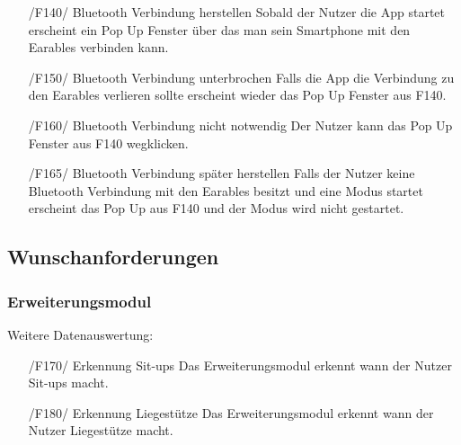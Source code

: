 \documentclass[a4paper,12pt]{article}
\begin{document}
\begin{itemize}
      \item[/F140/] \textsf{Bluetooth Verbindung herstellen} Sobald der Nutzer die App startet erscheint ein Pop Up Fenster über das man sein Smartphone mit den \gls{Earables} verbinden kann.
      \item[/F150/] \textsf{Bluetooth Verbindung unterbrochen} Falls die App die Verbindung zu den \gls{Earables} verlieren sollte erscheint wieder das Pop Up Fenster aus F140.
      \item[/F160/] \textsf{Bluetooth Verbindung nicht notwendig} Der Nutzer kann das Pop Up Fenster aus F140 wegklicken.
      \item[/F165/] \textsf{Bluetooth Verbindung später herstellen} Falls der Nutzer keine Bluetooth Verbindung mit den \gls{Earables} besitzt und eine Modus startet erscheint das Pop Up aus F140 und der Modus wird nicht gestartet.
    \end{itemize}
  \subsection{Wunschanforderungen}
    \subsubsection{Erweiterungsmodul}
      Weitere Datenauswertung:
      \begin{itemize}
      \item[/F170/] \textsf{Erkennung Sit-ups} Das Erweiterungsmodul erkennt wann der Nutzer Sit-ups macht.
      \item[/F180/] \textsf{Erkennung Liegestütze} Das Erweiterungsmodul erkennt wann der Nutzer Liegestütze macht.
      \end{itemize} 
\end{document}
